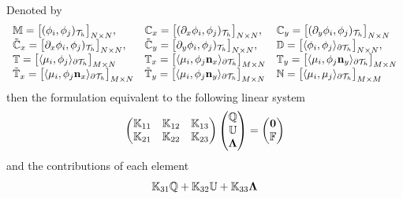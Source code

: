 \documentclass[10pt,reqno, final]{amsart}
\begin{document}
Denoted by
\begin{equation}
\begin{array}{lll}
\mathbb{M}=\big[(\phi_i, \phi_j)_{\mathcal{T}_h}\big]_{N\times N},
&\mathbb{C}_x=\big[(\partial_x\phi_i, \phi_j)_{\mathcal{T}_h}\big]_{N\times N},
&\mathbb{C}_y=\big[(\partial_y\phi_i, \phi_j)_{\mathcal{T}_h}\big]_{N\times N}\\
\tilde{\mathbb{C}}_x=\big[\partial_x\phi_i, \phi_j)_{\mathcal{T}_h}\big]_{N\times N},
&\tilde{\mathbb{C}}_y=\big[\partial_y\phi_i, \phi_j)_{\mathcal{T}_h}\big]_{N\times N}, &\mathbb{D}=\big[\langle\phi_i, \phi_j\rangle_{\partial\mathcal{T}_h}\big]_{N\times N},\\
\mathbb{T}=\big[\langle\mu_i, \phi_j\rangle_{\partial\mathcal{T}_h}\big]_{M\times N}
&\mathbb{T}_x=\big[\langle\mu_i, \phi_j{\bf n}_x\rangle_{\partial\mathcal{T}_h}\big]_{M\times N}
&\mathbb{T}_y=\big[\langle\mu_i, \phi_j{\bf n}_y\rangle_{\partial\mathcal{T}_h}\big]_{M\times N}\\
\tilde{\mathbb{T}}_x=\big[\langle \mu_i, \phi_j{\bf n}_x\rangle_{\partial\mathcal{T}_h}\big]_{M\times N}
&\tilde{\mathbb{T}}_y=\big[\langle \mu_i, \phi_j{\bf n}_y\rangle_{\partial\mathcal{T}_h}\big]_{M\times N}
&\mathbb{N}=\big[\langle\mu_i, \mu_j\rangle_{\partial\mathcal{T}_h}\big]_{M\times M}
\end{array}
\end{equation}
then the formulation equivalent to the following linear system
\begin{equation}\label{relation}
\begin{pmatrix}
\mathbb{K}_{11} & \mathbb{K}_{12} & \mathbb{K}_{13}\\
\mathbb{K}_{21} & \mathbb{K}_{22} & \mathbb{K}_{23}
\end{pmatrix}
\begin{pmatrix}
\mathbb{Q}\\
\mathbb{U}\\
{\bf\Lambda}
\end{pmatrix}=
\begin{pmatrix}
{\bf 0}\\
\mathbb{F}\\
\end{pmatrix}
\end{equation}
and the contributions of each element
\begin{equation}\label{contributions}
\mathbb K_{31}\mathbb Q +\mathbb K_{32} \mathbb U +\mathbb K_{33}{\bf\Lambda}
\end{equation}
\end{document}
